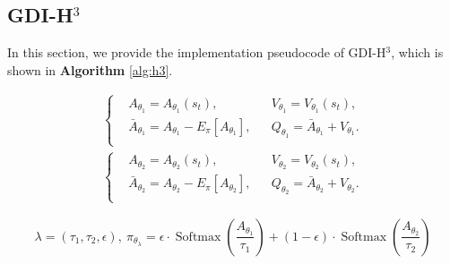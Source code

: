 \documentclass[nohyperref]{article}
\theoremstyle{plain}
\begin{document}
\clearpage
\subsection{GDI-H$^3$}
In this section, we provide the implementation pseudocode of GDI-H$^3$, which is shown in \textbf{Algorithm} \ref{alg:h3}.

\begin{equation}
\label{Equ: h3 casa equ}
    \begin{aligned}
    \left\{
    \begin{aligned}
        &A_{\theta_1}=A_{\theta_1}\left(s_{t}\right),& 
        &V_{\theta_1}=V_{\theta_1}\left(s_{t}\right), \\
        &\bar{A}_{\theta_1}=A_{\theta_1}-E_{\pi}[A_{\theta_1}],& 
        &Q_{\theta_1}=\bar{A}_{\theta_1}+V_{\theta_1}. \\
    \end{aligned}
    \right.\\
    \left\{
    \begin{aligned}
        &A_{\theta_2}=A_{\theta_2}\left(s_{t}\right),& 
        &V_{\theta_2}=V_{\theta_2}\left(s_{t}\right), \\
        &\bar{A}_{\theta_2}=A_{\theta_2}-E_{\pi}[A_{\theta_2}],& 
        &Q_{\theta_2}=\bar{A}_{\theta_2}+V_{\theta_2}. \\
    \end{aligned}
    \right.
    \end{aligned}
\end{equation}

\begin{equation}
\label{Equ: h3 soft entropy}
    \lambda = (\tau_1, \tau_2, \epsilon), \ 
    \pi_{\theta_{\lambda}}=\epsilon \cdot \operatorname{Softmax}\left(\frac{A_{\theta_1}}{\tau_{1}}\right)+(1-\epsilon) \cdot \operatorname{Softmax}\left(\frac{A_{\theta_2}}{\tau_{2}}\right)
\end{equation}
\end{document}
